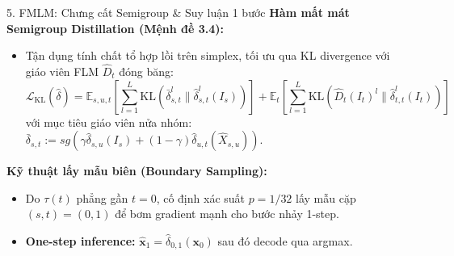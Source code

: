 \begin{frame}{5. FMLM: Chưng cất Semigroup \& Suy luận 1 bước}
    \textbf{Hàm mất mát Semigroup Distillation (Mệnh đề 3.4):}
    \begin{itemize}
        \item Tận dụng tính chất tổ hợp lồi trên simplex, tối ưu qua KL divergence với giáo viên FLM $\hat{D}_t$ đóng băng:
        $$\mathcal{L}_{\text{KL}}(\hat{\delta}) = \mathbb{E}_{s,u,t} \left[ \sum_{l=1}^L \text{KL}(\bar{\delta}^l_{s,t} \parallel \hat{\delta}^l_{s,t}(I_s)) \right] + \mathbb{E}_{t} \left[ \sum_{l=1}^L \text{KL}(\hat{D}_t(I_t)^l \parallel \hat{\delta}^l_{t,t}(I_t)) \right]$$
        với mục tiêu giáo viên nửa nhóm: $\bar{\delta}_{s,t} := sg\left(\gamma \hat{\delta}_{s,u}(I_s) + (1 - \gamma)\hat{\delta}_{u,t}(\hat{X}_{s,u})\right)$.
    \end{itemize}
    \vspace{0.2cm}
    \textbf{Kỹ thuật lấy mẫu biên (Boundary Sampling):}
    \begin{itemize}
        \item Do $\tau(t)$ phẳng gần $t = 0$, cố định xác suất $p = 1/32$ lấy mẫu cặp $(s, t) = (0, 1)$ để bơm gradient mạnh cho bước nhảy 1-step.
        \item \textbf{One-step inference:} $\hat{\mathbf{x}}_1 = \hat{\delta}_{0,1}(\mathbf{x}_0)$ sau đó decode qua argmax.
    \end{itemize}
\end{frame}

